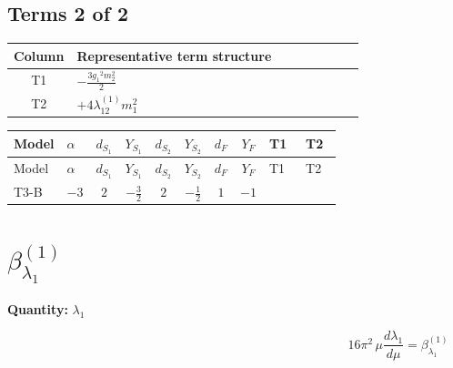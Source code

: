 \documentclass[8pt]{article}
\begin{document}
\begin{landscape}
\subsection*{Terms 2 of 2}
\begin{center}
\begin{tabular}{@{}c >{\raggedright\arraybackslash}p{0.82\linewidth}@{}}
\toprule
Column & Representative term structure \\
\midrule
T1 & \(\displaystyle -\frac{3 {g_1}^2 {m_2^2}}{2}\) \\
\midrule
T2 & \(\displaystyle +4 {\lambda_{12}^{(1)}} {m_1^2}\) \\
\midrule
\bottomrule
\end{tabular}
\end{center}
\smallskip
\tiny
\begin{longtable}{@{}llcccccc >{\raggedright\arraybackslash}p{0.21\linewidth} >{\raggedright\arraybackslash}p{0.21\linewidth}@{}}
\toprule
Model & $\alpha$ & $d_{S_1}$ & $Y_{S_1}$ & $d_{S_2}$ & $Y_{S_2}$ & $d_F$ & $Y_F$ & T1 & T2 \\
\midrule
\endfirsthead
\toprule
Model & $\alpha$ & $d_{S_1}$ & $Y_{S_1}$ & $d_{S_2}$ & $Y_{S_2}$ & $d_F$ & $Y_F$ & T1 & T2 \\
\midrule
\endhead
T3-B & $-3$ & $2$ & $-\frac{3}{2}$ & $2$ & $-\frac{1}{2}$ & $1$ & $-1$ & \scriptsize\adjustbox{max width=\linewidth}{$\begin{gathered} -\frac{3 {g_1}^2 {m_2^2}}{2}\end{gathered}$} & \scriptsize\adjustbox{max width=\linewidth}{$\begin{gathered} +4 {\lambda_{12}^{(1)}} {m_1^2}\end{gathered}$} \\
\midrule
\bottomrule
\end{longtable}
\clearpage
\section*{$\beta_{\lambda_1}^{(1)}$}
\noindent\textbf{Quantity: }$\lambda_1$\par\smallskip
\[16\pi^2\,\mu\frac{d \lambda_1}{d\mu}=\beta_{\lambda_1}^{(1)}\]

\end{landscape}
\end{document}
